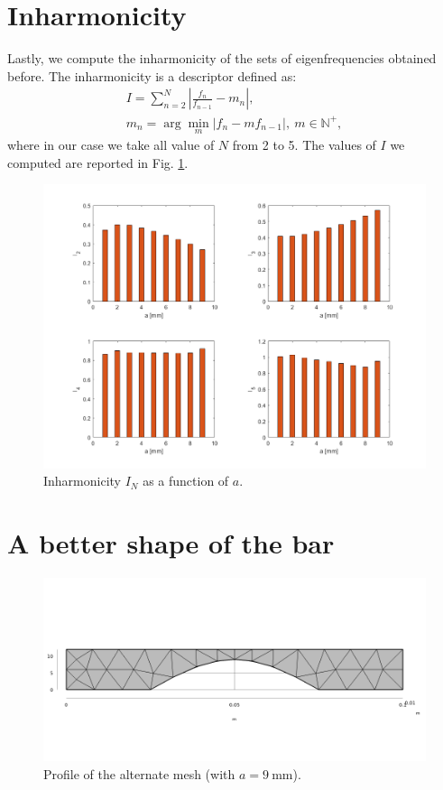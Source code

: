 \documentclass[a4paper]{article}
\begin{document}
\section{Inharmonicity}

Lastly, we compute the inharmonicity of the sets of eigenfrequencies obtained before. The inharmonicity is a descriptor defined as:
\begin{gather*}
	I = \sum_{n=2}^{N} \left| \frac{f_n}{f_{n-1}} - m_n \right|, \\
	m_n = \arg \underset{m}{\min} \left| f_n - m f_{n-1} \right|,~ m \in \mathbb{N}^+,
\end{gather*}
where in our case we take all value of $N$ from 2 to 5. The values of $I$ we computed are reported in Fig. \ref{fig:inharm}.

\begin{figure}[h]
	\centering
	\includegraphics[width=0.85\linewidth]{inharmonicity.png}
	\caption{Inharmonicity $I_N$ as a function of $a$.}
	\label{fig:inharm}
\end{figure}

\section{A better shape of the bar}

\begin{figure}[h]
	\centering
	\includegraphics[width=0.65\linewidth]{newmesh.png}
	\caption{Profile of the alternate mesh (with $a=9~\si{\milli\meter}$).}
	\label{fig:thin}
\end{figure}
\end{document}

